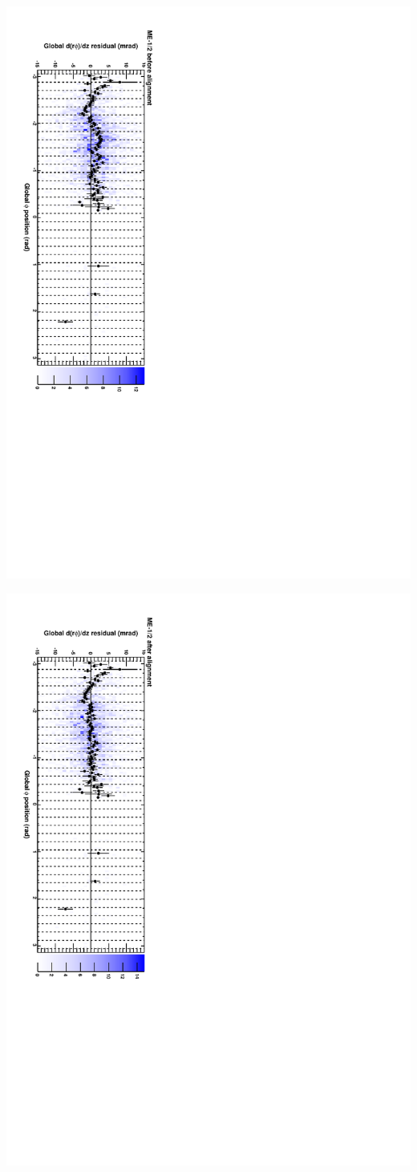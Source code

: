 \documentclass[compress]{beamer}
\begin{document}
\begin{frame}
\includegraphics[height=\linewidth, angle=90]{cscphiy_mem12_before.pdf}

\includegraphics[height=\linewidth, angle=90]{cscphiy_mem12_after.pdf}
\end{frame}
\end{document}
